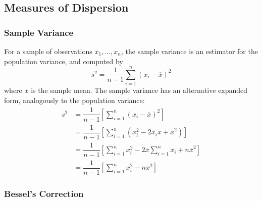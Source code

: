 \documentclass[11pt]{report} %
\begin{document}
\subsection{Measures of Dispersion}

\subsubsection{Sample Variance}

For a sample of observations $x_{1}, \dots, x_{n}$, the sample variance is an estimator for the population variance, and computed by
\begin{equation}
s^{2} = \dfrac{1}{n - 1}\sum_{i = 1}^{n}\left(x_{i} - \overline{x}\right)^{2}
\end{equation}
where $\overline{x}$ is the sample mean. The sample variance has an alternative expanded form, analogously to the population variance:
\begin{align}
s^{2} &= \dfrac{1}{n - 1}\left[\sum_{i = 1}^{n}\left(x_{i} - \overline{x}\right)^{2}\right] \\
&= \dfrac{1}{n - 1}\left[\sum_{i = 1}^{n}\left(x_{i}^{2} - 2x_{i}\overline{x} + \overline{x}^{2}\right)\right] \\
&= \dfrac{1}{n - 1}\left[\sum_{i = 1}^{n}x_{i}^{2} - 2\overline{x}\sum_{i = 1}^{n}x_{i} + n\overline{x}^{2}\right] \\
&= \dfrac{1}{n - 1}\left[\sum_{i = 1}^{n}x_{i}^{2} - n\overline{x}^{2}\right]
\end{align}

\subsubsection{Bessel's Correction}
\end{document}
